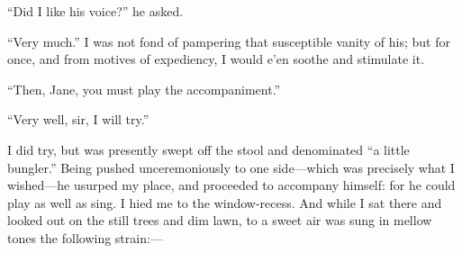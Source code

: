 \enquote{Did I like his voice?} he asked.

\enquote{Very much.}  I was not fond of pampering that susceptible
vanity of his; but for once, and from motives of expediency, I would
e'en soothe and stimulate it.

\enquote{Then, Jane, you must play the accompaniment.}

\enquote{Very well, sir, I will try.}

I did try, but was presently swept off the stool and denominated
\enquote{a little bungler.}  Being pushed unceremoniously to one
side---which was precisely what I wished---he usurped my place, and
proceeded to accompany himself: for he could play as well as sing.  I
hied me to the window-recess.  And while I sat there and looked out on
the still trees and dim lawn, to a sweet air was sung in mellow tones
the following strain:---

